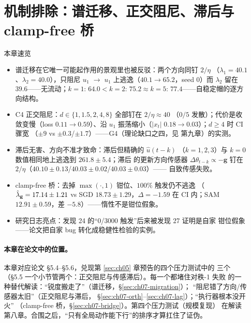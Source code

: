 
\section{机制排除：谱迁移、正交阻尼、滞后与 clamp-free 桥}
\label{sec:ch07}

\begin{keybox}{本章速览}
\begin{itemize}
  \item 谱迁移在它唯一可能起作用的景观里也被反驳：两个方向同钉 $2/\eta$
        （$\lambda_{1}=40.1$、$\lambda_{2}=40.0$），只阻尼 $u_{1}$ $\to$
        $u_{1}$ 上逃逸（$40.1\to65.2$，seed 0）而 $\lambda_{2}$ 留在
        $39.6$——无流动；$k{=}1{:}\,64.0<k{=}2{:}\,75.2\approx
        k{=}5{:}\,77.4$——自稳定帽的逐方向结构。
  \item C4 正交阻尼：$d\in\{1,1.5,2,4,8\}$ 全部钉在 $2/\eta\approx40$
        （$0/5$ 发散）；代价是收敛变慢（loss $0.11\to0.59$）、沿 $u_{1}$
        振荡缩小（$|x_{t}|$ $0.18\to0.03$）；$d\geq4$ 时 CI 骤宽
        （$\pm9$ vs $\pm0.3$/$\pm1.7$）——G4（理论缺口之四，见
        第九章）的实测。
  \item 滞后无害、方向不准才致命：滞后但精确的 $\hat u(t-k)$
        （$k{=}1,2,3$）与 $k{=}0$ 数值相同地上逃逸到 $261.8\pm5.4$；滞后
        的更新方向传感器 $\Delta\theta_{t-k}\propto-\mathbf{g}$ 钉在
        $2/\eta$（$40.10\pm0.13$/$40.03\pm0.02$/$40.03\pm0.03$）——
        自致传感失败。
  \item clamp-free 桥：去掉 $\max(\cdot,1)$ 钳位、$100\%$ 触发仍不逃逸
        （$\hat{\lambda}_{\mathbf{g}}=17.14\pm1.21$ vs SGD $18.73\pm1.29$，$\Delta=-1.59$
        在 CI 内；SAM $12.91\pm0.59$，差 $-5.8$）——惰性不是钳位假象。
  \item 研究日志亮点：发现 24 的``0/3000 触发''后来被发现 27 证明是自家
        钳位假象——论文把自家 bug 转化成稳健性检验的实例。
\end{itemize}
\end{keybox}

\paragraph{本章在论文中的位置。}
本章对应论文 §5.4--§5.6，兑现第 \ref{sec:ch05} 章预告的四个压力测试中的
三个（§5.5 一个小节管两个：正交阻尼与传感滞后）。每一个都堵住对秩-1 失败
的一种替代解读：``锐度搬走了''（谱迁移，§\ref{sec:ch07-migration}）；
``阻尼错了方向/传感器太旧''（正交阻尼与滞后，
§\ref{sec:ch07-orth}--\ref{sec:ch07-lag}）；``执行器根本没开火''
（clamp-free 桥，§\ref{sec:ch07-bridge}）。第四个压力测试（规模复现）
在解读第八章。合围之后，``只有全局动作能下行''的排序才算扛住了证伪。

